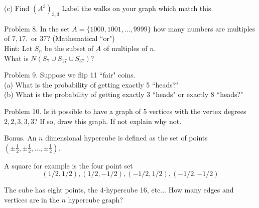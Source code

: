\documentclass[16 pt]{amsart}
\theoremstyle{definition}
\theoremstyle{remark}
\numberwithin{equation}{subsection}
\begin{document}
(c) Find $(A^3)_{3,3}$ Label the walks on your graph which match this.

\newpage

Problem 8.  In the set $A = \{1000,1001,\dots,9999 \}$ how many numbers are multiples of $7,17,$ or $37$? (Mathematical ``or")\\

Hint: Let $S_n$ be the subset of $A$ of multiples of $n$.\\

What is $N(S_7 \cup S_{17}\cup S_{37})$?


\newpage

Problem 9. Suppose we flip 11 ``fair" coins.\\
(a) What is the probability of getting exactly 5 ``heads?"\\
(b) What is the probability of getting exactly 3 ``heads" or exactly 8 ``heads?"

\vspace{2.5in}


Problem 10. Is it possible to have a graph of 5 vertices with the vertex degrees $2,2,3,3,3?$ If so, draw this graph.  If not explain why not.

\newpage

Bonus. An $n$ dimensional hypercube is defined as the set of points $(\pm \frac{1}{2},\pm \frac{1}{2},\dots,\pm \frac{1}{2})$.

A square for example is the four point set 
\[
(1/2,1/2),(1/2,-1/2),(-1/2,1/2),(-1/2,-1/2)
\]

The cube has eight points, the 4-hypercube 16, etc...
How many edges and vertices are in the $n$ hypercube graph?
\end{document}

